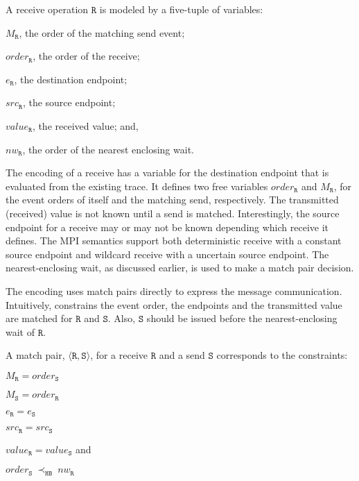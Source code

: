 \begin{definition}[Receive] \label{def:rcv}
A receive operation $\mathtt{R}$ is modeled by a five-tuple of variables:
\begin{compactenum}
\item $M_\mathtt{R}$, the order of the matching send event;
\item $\mathit{order}_\mathtt{R}$, the order of the receive;
\item $e_\mathtt{R}$, the destination endpoint;
\item $src_\mathtt{R}$, the source endpoint;
\item $\mathit{value}_\mathtt{R}$, the received value; and,
\item $\mathit{nw}_\mathtt{R}$, the order of the nearest enclosing wait.
\end{compactenum}
\end{definition}

The encoding of a receive has a variable for the destination endpoint that is evaluated from the existing trace. It defines two free variables $\mathit{order}_\mathtt{R}$ and $M_\mathtt{R}$, for the event orders of itself and the matching send, respectively. The transmitted (received) value is not known until a send is matched. Interestingly, the source endpoint for a receive may or may not be known depending which receive it defines. The MPI semantics support both deterministic receive with a constant source endpoint and wildcard receive with a uncertain source endpoint. The nearest-enclosing wait, as discussed earlier, is used to make a match pair decision. 

The encoding uses match pairs directly to express the message communication. Intuitively,  constrains the event order, the endpoints and the transmitted value are matched for $\mathtt{R}$ and $\mathtt{S}$. Also, $\mathtt{S}$ should be issued before the nearest-enclosing wait of $\mathtt{R}$. 

\begin{definition} \label{def:match}
A match pair, $\langle\mathtt{R}, \mathtt{S}\rangle$, for a receive
$\mathtt{R}$ and a send $\mathtt{S}$ corresponds to the constraints:
\begin{compactenum}
\item $M_{\mathtt{R}} = \mathit{order}_{\mathtt{S}}$
\item $M_{\mathtt{S}} = \mathit{order}_{\mathtt{R}}$
\item $e_{\mathtt{R}} = e_{\mathtt{S}}$
\item $src_\mathtt{R} = src_\mathtt{S}$
\item $\mathit{value}_{\mathtt{R}} = \mathit{value}_{\mathtt{S}}$ and
\item $\mathit{order}_{\mathtt{S}}\ \mathrm{\prec_\mathtt{HB}}\ \mathit{nw}_{\mathtt{R}}$
\end{compactenum}
\end{definition}

